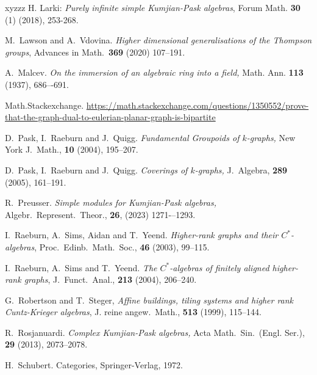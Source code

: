 \documentclass[12pt]{amsart}
\theoremstyle{definition}
\theoremstyle{remark}
\numberwithin{equation}{section}
\begin{document}
\begin{thebibliography}{xyzzz}
H. Larki: \emph{Purely infinite simple Kumjian-Pask algebras}, Forum Math. \textbf{30} (1) (2018), 253-268.

 M.\ Lawson and A.\ Vdovina. \emph{Higher dimensional generalisations of the Thompson groups}, Advances in Math.\ {\bf 369} (2020) 107--191.


 A.\ Malcev.
\newblock \emph{On the immersion of an algebraic ring into a field,}
\newblock Math. Ann. \textbf{113} (1937), 686–-691.


 Math.Stackexchange. 
\newblock \href{https://math.stackexchange.com/questions/1350552/prove-that-the-graph-dual-to-eulerian-planar-graph-is-bipartite}{https://math.stackexchange.com/questions/1350552/prove-that-the-graph-dual-to-eulerian-planar-graph-is-bipartite}


 D.~Pask, I.~Raeburn and J.~Quigg.
\newblock \emph{Fundamental Groupoids of $k$-graphs,}
\newblock New York J.\ Math., {\bf 10} (2004), 195--207.

 D.~Pask, I.~Raeburn and J.~Quigg.
\newblock \emph{Coverings of $k$-graphs,}
\newblock J.\ Algebra, {\bf 289} (2005), 161--191.





 R.\ Preusser. \emph{Simple modules for Kumjian-Pask algebras,} Algebr.\ Represent.\ Theor., \textbf{26}, (2023) 1271-–1293.



 I.\ Raeburn, A.\ Sims, Aidan and T.\ Yeend.
\emph{Higher-rank graphs and their {$C^*$}-algebras},
Proc.\ Edinb.\ Math.\ Soc., \textbf{46} (2003), 99--115.

 I.\ Raeburn,  A.\  Sims and T.\ Yeend.   
\emph{The {$C^*$}-algebras of finitely aligned higher-rank graphs}, J.\ Funct.\ Anal.,  \textbf{213} (2004), 206--240.



 G.\ Robertson and T.\ Steger,
\textit{Affine buildings, tiling systems and higher rank Cuntz-Krieger algebras}, J. reine angew.\ Math.,  \textbf{513} (1999), 115--144. 




 R.\ Rosjanuardi. \emph{Complex Kumjian-Pask algebras,} Acta Math.\ Sin.\ (Engl. Ser.), \textbf{29} (2013), 2073--2078.



 H.~Schubert.
\newblock Categories,
\newblock Springer-Verlag, 1972.



\end{thebibliography}
\end{document}
